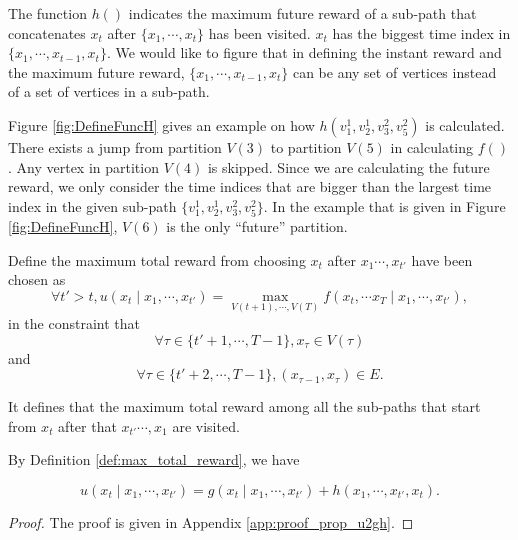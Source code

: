 \documentclass[12pt]{article}
\begin{document}
The function $ h() $ indicates the maximum future reward of a sub-path that concatenates $ x_{t} $ after $ \{  x_{1} , \cdots, x_{t} \} $ has been visited. 
$  x_{t} $ has the biggest time index in $ \{  x_{1} , \cdots, x_{t-1} , x_{t} \} $.
We would like to figure that in defining the instant reward and the maximum future reward, $ \{  x_{1} , \cdots, x_{t-1} , x_{t} \} $ can be any set of vertices instead of a set of vertices in a sub-path.

Figure \ref{fig:DefineFuncH} gives an example on how $ h(v^{1}_{1}, v^{1}_{2}, v^{2}_{3}, v^{2}_{5}) $ is calculated.
There exists a jump from partition $ V(3) $ to partition $ V(5) $ in calculating $ f() $.
Any vertex in partition $ V(4) $ is skipped.
Since we are calculating the future reward, we only consider the time indices that are bigger than the largest time index in the given sub-path $ \{ v^{1}_{1}, v^{1}_{2}, v^{2}_{3}, v^{2}_{5}  \} $.
In the example that is given in Figure \ref{fig:DefineFuncH}, $ V(6) $ is the only ``future'' partition.

\begin{mydef}
\label{def:max_total_reward}
Define the maximum total reward from choosing $ x_{t} $ after $ x_{1} \cdots , x_{t'} $ have been chosen as 
\begin{equation}
\label{eq:def_p_0}
\forall t' > t, 
u(x_{t} \mid x_{1} , \cdots , x_{t'} ) = \max_{V(t+1), \cdots , V(T)} f(x_{t}, \cdots x_{T} \mid x_{1}, \cdots , x_{t'}),
\end{equation}
in the constraint that
\begin{equation}
\label{eq:def_p_0:constraint1}
\forall \tau \in \{ t'+1 , \cdots , T-1 \}, x_{ \tau } \in V( \tau )
\end{equation}
and
\begin{equation}
\label{eq:def_p_0:constraint2}
\forall \tau \in \{ t'+2, \cdots ,T-1 \}, ( x_{ \tau-1 }, x_{ \tau } ) \in E .
\end{equation}
\end{mydef}

It defines that the maximum total reward among all the sub-paths that start from $ x_{t} $ after that $ x_{t'} \cdots , x_{1} $ are visited.

By Definition \ref{def:max_total_reward}, we have
\begin{propty}
\label{prop:u2gh}
\begin{equation}
\label{eq:def_p}
u(x_{t} \mid x_{1} , \cdots , x_{t'} ) = g(x_{t} \mid x_{1} , \cdots , x_{t'} ) + h( x_{1} , \cdots, x_{t'}, x_{t} ).
\end{equation}
\begin{proof}
The proof is given in Appendix \ref{app:proof_prop_u2gh}.
\end{proof}
\end{propty}
\end{document}

